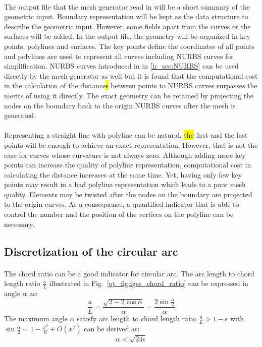 \paragraph{}
The output file that the mesh generator read in will be a short summary of the geometric input.
Boundary representation will be kept as the data structure to describe the geometric input.
However, some fields apart from the curves or the surfaces will be added.
In the output file, the geometry will be organized in key points, polylines and surfaces.
The key points define the coordinates of all points and polylines are used to represent all curves including NURBS curves for simplification.
NURBS curves introduced in in \ref{lr_sec:NURBS} can be used directly by the mesh generator as well but it is found that the computational cost in the calculation of the distance\hl{s} between points to NURBS curves surpasses the merits of using it directly.
The exact geometry can be retained by projecting the nodes on the boundary back to the origin NURBS curves after the mesh is generated.

\paragraph{}
Representing a straight line with polyline can be natural, \hl{the} first and the last points will be enough to achieve an exact representation.
However, that is not the case for curves whose curvature is not always zero.
Although adding more key points can increase the quality of polyline representation, computational cost in calculating the distance increases at the same time.
Yet, having only few key points may result in a bad polyline representation which leads to a poor mesh quality.
Elements may be twisted after the nodes on the boundary are projected to the origin curves.
As a consequence, a quantified indicator that is able to control the number and the position of the vertices on the polyline can be necessary.

\subsection{Discretization of the circular arc}
\paragraph{}
The chord ratio can be a good indicator for circular arc.
The arc length to chord length ratio $\frac{a}{L}$ illustrated in Fig.~\ref{qt_fig:iges_chord_ratio} can be expressed in angle $\alpha$ as:
    \begin{equation}
        \frac{a}{L} = \frac{
            \sqrt{2-2\cos\alpha}
        }{\alpha}
        = \frac{
            2\sin\frac{\alpha}{2}
        }{\alpha}
    \end{equation}
%
The maximum angle $\alpha$ satisfy arc length to chord length ratio $\frac{a}{L} > 1-\epsilon$ with $
    \sin\frac{\alpha}{2} = 1 - \frac{x^3}{6} + O(x^7)
$ can be derived as:
    \begin{equation}
        \alpha < \sqrt{24 \epsilon}
    \end{equation}

